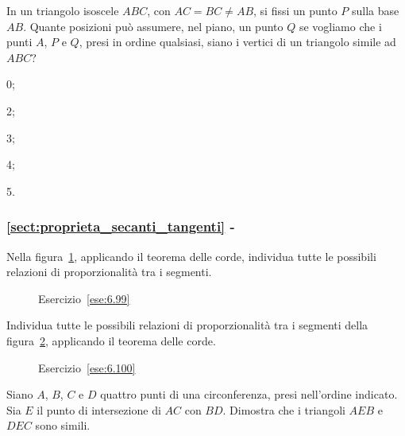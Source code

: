 \begin{esercizio}
\label{ese:6.98}
In un triangolo isoscele $ABC$, con $AC = BC \neq AB$, si fissi un punto $P$ sulla base $AB$. Quante posizioni può assumere, nel piano, un punto $Q$ se vogliamo che i punti $A$, $P$ e $Q$, presi in ordine qualsiasi, siano i vertici di un triangolo simile ad $ABC$?
\begin{multicols}{5}
\begin{enumeratea}
\item 0;
\item 2;
\item 3;
\item 4;
\item 5.
\end{enumeratea}
\end{multicols}
\end{esercizio}

\begingroup
\hypersetup{linkcolor=black}
\subsubsection*{\ref{sect:proprieta_secanti_tangenti} - }
\endgroup

\begin{esercizio}
\label{ese:6.99}
Nella figura~\ref{fig:ese6.99}, applicando il teorema delle corde, individua tutte le possibili relazioni di proporzionalità tra i segmenti.
\end{esercizio}

\begin{figure}[!htb]
	\centering
	\caption{Esercizio~\ref{ese:6.99}}\label{fig:ese6.99}
\end{figure}

\begin{esercizio}
\label{ese:6.100}
Individua tutte le possibili relazioni di proporzionalità tra i segmenti della figura~\ref{fig:ese6.100}, applicando il teorema delle corde.
\end{esercizio}

\begin{figure}[!htb]
	\centering
	\caption{Esercizio~\ref{ese:6.100}}\label{fig:ese6.100}
\end{figure}

\begin{esercizio}
\label{ese:6.101}
Siano $A$, $B$, $C$ e $D$ quattro punti di una circonferenza, presi nell'ordine indicato. Sia $E$ il punto di intersezione di $AC$ con $BD$. Dimostra che i triangoli $AEB$ e $DEC$ sono simili.
\end{esercizio}

